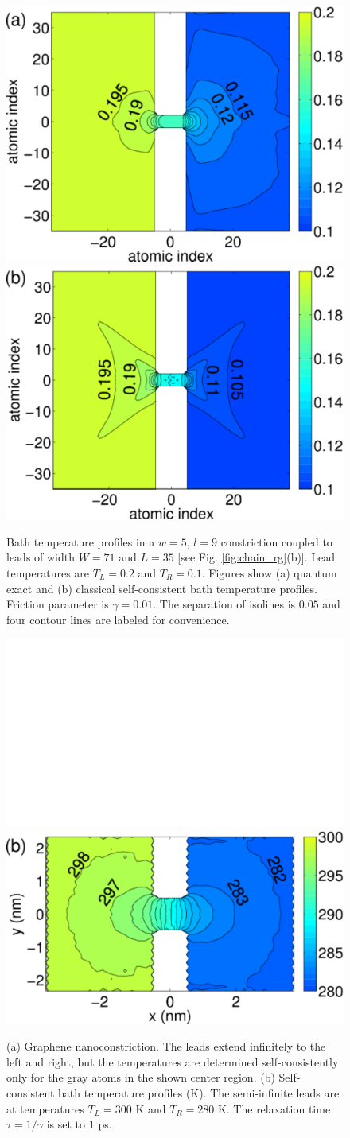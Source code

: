 \begin{figure}
 \includegraphics[width=.49\columnwidth]{pics/gf_fig7a.pdf}
 \includegraphics[width=.49\columnwidth]{pics/gf_fig7b.pdf}
 \caption{Bath temperature profiles in a $w=5$, $l=9$ constriction coupled to leads of width $W=71$ and $L=35$ [see Fig. \ref{fig:chain_rg}(b)]. Lead temperatures are $T_L=0.2$ and $T_R=0.1$. Figures show (a) quantum exact and (b) classical self-consistent bath temperature profiles. Friction parameter is $\gamma=0.01$. The separation of isolines is $0.05$ and four contour lines are labeled for convenience.}
 \label{fig:gf_fig7}
\end{figure}

\begin{figure}
 \begin{center}
 \includegraphics[width=.49\columnwidth]{pics/gf_fig8a.pdf}
 \includegraphics[width=.49\columnwidth]{pics/gf_fig8b.pdf}
 \end{center}
 \caption{(a) Graphene nanoconstriction. The leads extend infinitely to the left and right, but the temperatures are determined self-consistently only for the gray atoms in the shown center region. (b) Self-consistent bath temperature profiles (K). The semi-infinite leads are at temperatures $T_L=300$ K and $T_R=280$ K. The relaxation time $\tau=1/\gamma$ is set to $1$ ps.}
 \label{fig:gf_fig8}
\end{figure}

